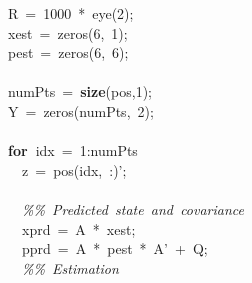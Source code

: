 \documentclass{article}\usepackage{graphicx, color}
\newcommand{\hlstd}[1]{\textcolor[rgb]{0,0,0}{#1}}%
\newcommand{\hlnum}[1]{\textcolor[rgb]{0.16,0.16,1}{#1}}
\newcommand{\hlslc}[1]{\textcolor[rgb]{0.51,0.51,0.51}{\it{#1}}}
\newcommand{\hlkwa}[1]{\textcolor[rgb]{0,0,0}{\bf{#1}}}
\newcommand{\hlopt}[1]{\textcolor[rgb]{0,0,0}{#1}}
\begin{document}
\hlstd{}\hlstd{\ \ }\hlstd{R\ }\hlopt{=\ }\hlstd{}\hlnum{1000\ }\hlstd{}\hlopt{{*}\ }\hlstd{eye}\hlopt{(}\hlstd{}\hlnum{2}\hlstd{}\hlopt{);}\hspace*{\fill}\\
\hlstd{}\hlstd{\ \ }\hlstd{x\textunderscore est\ }\hlopt{=\ }\hlstd{zeros}\hlopt{(}\hlstd{}\hlnum{6}\hlstd{}\hlopt{,\ }\hlstd{}\hlnum{1}\hlstd{}\hlopt{);}\hspace*{\fill}\\
\hlstd{}\hlstd{\ \ }\hlstd{p\textunderscore est\ }\hlopt{=\ }\hlstd{zeros}\hlopt{(}\hlstd{}\hlnum{6}\hlstd{}\hlopt{,\ }\hlstd{}\hlnum{6}\hlstd{}\hlopt{);}\hspace*{\fill}\\
\hlstd{\hspace*{\fill}\\
}\hlstd{\ \ }\hlstd{numPts\ }\hlopt{=\ }\hlstd{}\hlkwa{size}\hlstd{}\hlopt{(}\hlstd{pos}\hlopt{,}\hlstd{}\hlnum{1}\hlstd{}\hlopt{);}\hspace*{\fill}\\
\hlstd{}\hlstd{\ \ }\hlstd{Y\ }\hlopt{=\ }\hlstd{zeros}\hlopt{(}\hlstd{numPts}\hlopt{,\ }\hlstd{}\hlnum{2}\hlstd{}\hlopt{);}\hspace*{\fill}\\
\hlstd{\hspace*{\fill}\\
}\hlstd{\ \ }\hlstd{}\hlkwa{for\ }\hlstd{idx\ }\hlopt{=\ }\hlstd{}\hlnum{1}\hlstd{}\hlopt{:}\hlstd{numPts\hspace*{\fill}\\
}\hlstd{\ \ \ \ }\hlstd{z\ }\hlopt{=\ }\hlstd{pos}\hlopt{(}\hlstd{idx}\hlopt{,\ :)}\hlstd{'}\hlopt{;}\hspace*{\fill}\\
\hlstd{\hspace*{\fill}\\
}\hlstd{\ \ \ \ }\hlstd{}\hlslc{\%\%\ Predicted\ state\ and\ covariance}\hspace*{\fill}\\
\hlstd{}\hlstd{\ \ \ \ }\hlstd{x\textunderscore prd\ }\hlopt{=\ }\hlstd{A\ }\hlopt{{*}\ }\hlstd{x\textunderscore est}\hlopt{;}\hspace*{\fill}\\
\hlstd{}\hlstd{\ \ \ \ }\hlstd{p\textunderscore prd\ }\hlopt{=\ }\hlstd{A\ }\hlopt{{*}\ }\hlstd{p\textunderscore est\ }\hlopt{{*}\ }\hlstd{A'\ }\hlopt{+\ }\hlstd{Q}\hlopt{;}\hspace*{\fill}\\
\hlstd{}\hlstd{\ \ \ \ }\hlstd{}\hlslc{\%\%\ Estimation}\hspace*{\fill}\\
\end{document}
